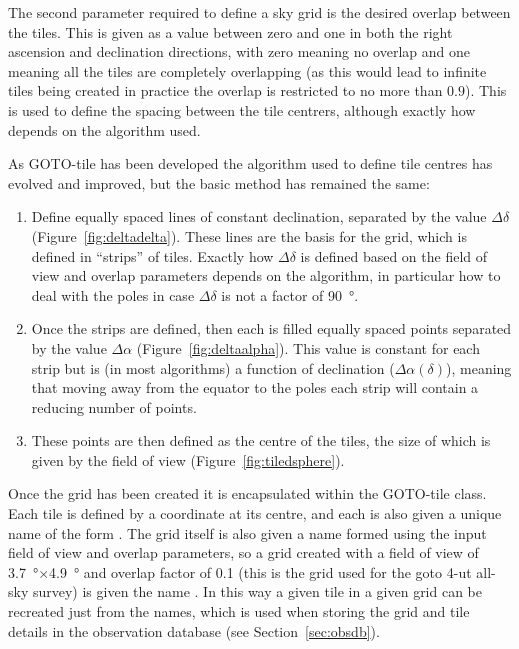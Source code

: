 \begin{colsection}
\begin{colsection}
The second parameter required to define a sky grid is the desired overlap between the tiles. This is given as a value between zero and one in both the right ascension and declination directions, with zero meaning no overlap and one meaning all the tiles are completely overlapping (as this would lead to infinite tiles being created in practice the overlap is restricted to no more than $0.9$). This is used to define the spacing between the tile centrers, although exactly how depends on the algorithm used.

As GOTO-tile has been developed the algorithm used to define tile centres has evolved and improved, but the basic method has remained the same:

\begin{enumerate}
    \item Define equally spaced lines of constant declination, separated by the value $\Delta\delta$ (Figure~\ref{fig:deltadelta}). These lines are the basis for the grid, which is defined in ``strips'' of tiles. Exactly how $\Delta\delta$ is defined based on the field of view and overlap parameters depends on the algorithm, in particular how to deal with the poles in case $\Delta\delta$ is not a factor of \SI{90}{\degree}.
    \item Once the strips are defined, then each is filled equally spaced points separated by the value $\Delta\alpha$ (Figure~\ref{fig:deltaalpha}). This value is constant for each strip but is (in most algorithms) a function of declination ($\Delta\alpha(\delta)$), meaning that moving away from the equator to the poles each strip will contain a reducing number of points.
    \item These points are then defined as the centre of the tiles, the size of which is given by the field of view (Figure~\ref{fig:tiledsphere}).
\end{enumerate}

Once the grid has been created it is encapsulated within the GOTO-tile  class. Each tile is defined by a coordinate at its centre, and each is also given a unique name of the form . The grid itself is also given a name formed using the input field of view and overlap parameters, so a grid created with a field of view of \SI{3.7}{\degree}$\times$\SI{4.9}{\degree} and overlap factor of 0.1 (this is the grid used for the \gls{goto} 4-\gls{ut} all-sky survey) is given the name . In this way a given tile in a given grid can be recreated just from the names, which is used when storing the grid and tile details in the observation database (see Section~\ref{sec:obsdb}). %


\end{colsection}
\end{colsection}
